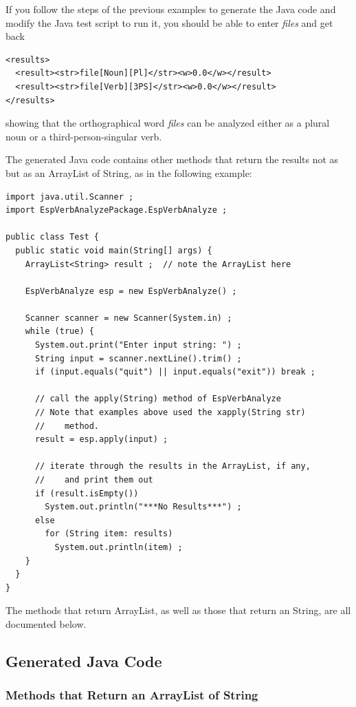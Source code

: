 If you follow the steps of the previous examples to generate the Java code and modify the Java test script to
run it, you should be able to enter \emph{files} and get back


\begin{Verbatim}
<results>
  <result><str>file[Noun][Pl]</str><w>0.0</w></result>
  <result><str>file[Verb][3PS]</str><w>0.0</w></result>
</results>
\end{Verbatim}

\noindent
showing that the orthographical word \emph{files} can be analyzed either as a plural noun or a
third-person-singular verb.

The generated Java code contains other methods that return the results not as \xml{} but as an
ArrayList of String, as in the following example:

\begin{Verbatim}
import java.util.Scanner ;
import EspVerbAnalyzePackage.EspVerbAnalyze ;

public class Test {
  public static void main(String[] args) {
    ArrayList<String> result ;  // note the ArrayList here

    EspVerbAnalyze esp = new EspVerbAnalyze() ;

    Scanner scanner = new Scanner(System.in) ;
    while (true) {
      System.out.print("Enter input string: ") ;
      String input = scanner.nextLine().trim() ;
      if (input.equals("quit") || input.equals("exit")) break ;

      // call the apply(String) method of EspVerbAnalyze
      // Note that examples above used the xapply(String str)
      //    method.
      result = esp.apply(input) ;

      // iterate through the results in the ArrayList, if any, 
      //    and print them out
      if (result.isEmpty())
        System.out.println("***No Results***") ;
      else 
        for (String item: results)
          System.out.println(item) ;
    }
  }
}
\end{Verbatim}

The methods that return ArrayList, as well as those that return an \xml{} String, are all
documented below.

\subsection{Generated Java Code }

\subsubsection{Methods that Return an ArrayList of String}

